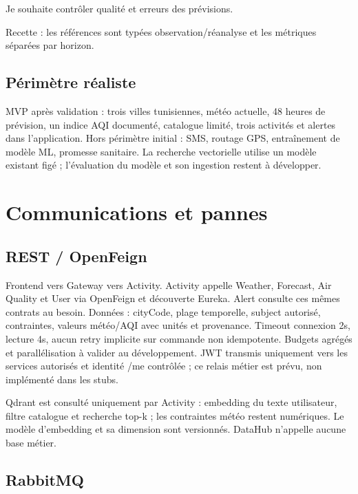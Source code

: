 \documentclass[10pt,a4paper]{article}
\begin{document}
Je souhaite contrôler qualité et erreurs des prévisions.\par

Recette : les références sont typées observation/réanalyse et les métriques séparées par horizon.\par

\subsection*{Périmètre réaliste}

MVP après validation : trois villes tunisiennes, météo actuelle, 48 heures de prévision, un indice AQI documenté, catalogue limité, trois activités et alertes dans l'application. Hors périmètre initial : SMS, routage GPS, entraînement de modèle ML, promesse sanitaire. La recherche vectorielle utilise un modèle existant figé ; l'évaluation du modèle et son ingestion restent à développer.\par
\clearpage
\section*{Communications et pannes}

\subsection*{REST / OpenFeign}

Frontend  vers  Gateway  vers  Activity. Activity appelle Weather, Forecast, Air Quality et User via OpenFeign et découverte Eureka. Alert consulte ces mêmes contrats au besoin. Données : cityCode, plage temporelle, subject autorisé, contraintes, valeurs météo/AQI avec unités et provenance. Timeout connexion 2s, lecture 4s, aucun retry implicite sur commande non idempotente. Budgets agrégés et parallélisation à valider au développement. JWT transmis uniquement vers les services autorisés et identité /me contrôlée ; ce relais métier est prévu, non implémenté dans les stubs.\par

Qdrant est consulté uniquement par Activity : embedding du texte utilisateur, filtre catalogue et recherche top-k ; les contraintes météo restent numériques. Le modèle d'embedding et sa dimension sont versionnés. DataHub n'appelle aucune base métier.\par

\subsection*{RabbitMQ}
\end{document}
